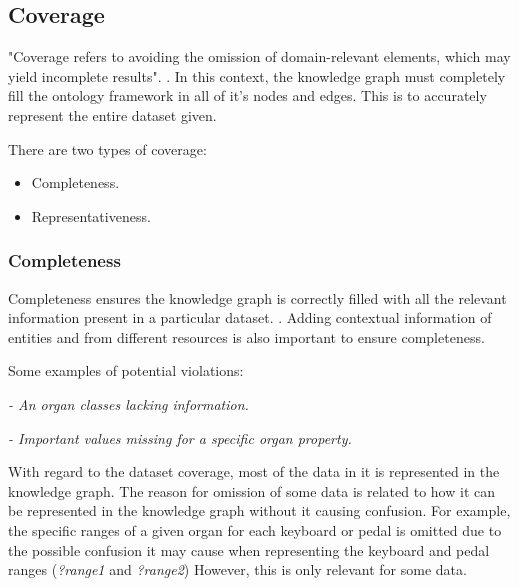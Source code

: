 \subsection{Coverage}
\hspace{0.5cm} "Coverage refers to avoiding the omission of domain-relevant elements, which may yield incomplete results". \cite{knowledgegraphevaulationbook}. In this context, the knowledge graph must completely fill the ontology framework in all of it's nodes and edges. This is to accurately represent the entire dataset given. 

\noindent There are two types of coverage: 

\vspace{-0.2cm}
\begin{itemize}
\itemsep0em 
\item Completeness.
\vspace{-0.1cm}
\item Representativeness.
\end{itemize}
\vspace{-0.4cm}

\subsubsection{Completeness}
\hspace{0.5cm} Completeness ensures the knowledge graph is correctly filled with all the relevant information present in a particular dataset. \cite{knowledgegraphevaulationbook}. Adding contextual information of entities and from different resources \cite{evaluationpaper} is also important to ensure completeness. 

\noindent Some examples of potential violations:

\vspace{-0.1cm}
\begin{displayquote}
    \textit{- An organ classes lacking information.}
\end{displayquote}
\vspace{-0.6cm}
\begin{displayquote}
    \textit{- Important values missing for a specific organ property.}
\end{displayquote}
\vspace{-0.1cm}

With regard to the dataset coverage, most of the data in it is represented in the knowledge graph. The reason for omission of some data is related to how it can be represented in the knowledge graph without it causing confusion. For example, the specific ranges of a given organ for each keyboard or pedal is omitted due to the possible confusion it may cause when representing the keyboard and pedal ranges (\textit{?range1} and \textit{?range2}) However, this is only relevant for some data. 

